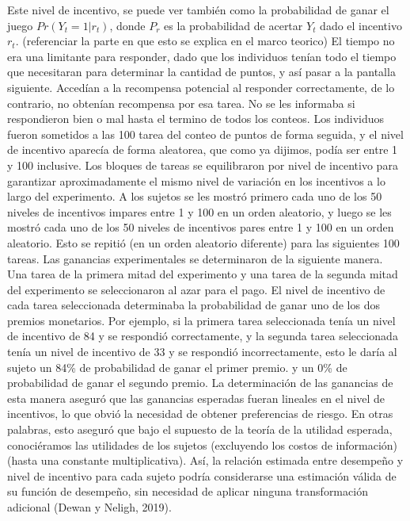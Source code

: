 \documentclass[11pt,letterpaper]{article}
\begin{document}
Este nivel de incentivo, se puede ver también como la probabilidad de ganar el juego $Pr(Y_t=1|r_t)$, donde $P_r$ es la probabilidad de acertar $Y_t$ dado el incentivo $r_t$. (referenciar la parte en que esto se explica en el marco teorico)
El tiempo no era una limitante para responder, dado que los individuos tenían todo el tiempo que necesitaran para determinar la cantidad de puntos, y así pasar a la pantalla siguiente. Accedían a la recompensa potencial al responder correctamente, de lo contrario, no obtenían recompensa por esa tarea. No se les informaba si respondieron bien o mal hasta el termino de todos los conteos.
Los individuos fueron sometidos a las 100 tarea del conteo de puntos de forma seguida, y el nivel de incentivo aparecía de forma aleatorea, que como ya dijimos, podía ser entre 1 y 100 inclusive.
Los bloques de tareas se equilibraron por nivel de incentivo para garantizar aproximadamente el mismo nivel de variación en los incentivos a lo largo del experimento. A los sujetos se les mostró primero cada uno de los 50 niveles de incentivos impares entre 1 y 100 en un orden aleatorio, y luego se les mostró cada uno de los 50 niveles de incentivos pares entre 1 y 100 en un orden aleatorio. Esto se repitió (en un orden aleatorio diferente) para las siguientes 100 tareas.
Las ganancias experimentales se determinaron de la siguiente manera. Una tarea de la primera mitad del experimento y una tarea de la segunda mitad del experimento se seleccionaron al azar para el pago. El nivel de incentivo de cada tarea seleccionada determinaba la probabilidad de ganar uno de los dos premios monetarios. Por ejemplo, si la primera tarea seleccionada tenía un nivel de incentivo de 84 y se respondió correctamente, y la segunda tarea seleccionada tenía un nivel de incentivo de 33 y se respondió incorrectamente, esto le daría al sujeto un 84\% de probabilidad de ganar el primer premio. y un 0\% de probabilidad de ganar el segundo premio. La determinación de las ganancias de esta manera aseguró que las ganancias esperadas fueran lineales en el nivel de incentivos, lo que obvió la necesidad de obtener preferencias de riesgo. En otras palabras, esto aseguró que bajo el supuesto de la teoría de la utilidad esperada, conociéramos las utilidades de los sujetos (excluyendo los costos de información) (hasta una constante multiplicativa). Así, la relación estimada entre desempeño y nivel de incentivo para cada sujeto podría considerarse una estimación válida de su función de desempeño, sin necesidad de aplicar ninguna transformación adicional (Dewan y Neligh, 2019).
\end{document}
